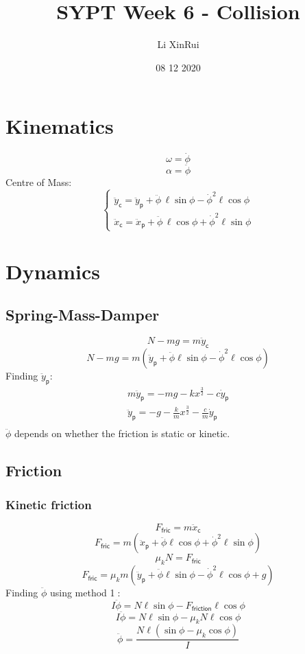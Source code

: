 \documentclass{scrartcl}
\begin{document}
\title{SYPT Week 6 - Collision}
\author{Li XinRui}
\date{08 12 2020}
\setlength\parindent{0pt}

\maketitle
\section{Kinematics}
$$\omega=\dot\phi$$
$$\alpha=\ddot\phi$$
Centre of Mass:
$$
    \begin{cases}
      \ddot{y}_{\textsf{c}}=\ddot{y}_{\textsf{p}}+\ddot \phi \, \ell \sin\phi-\dot \phi^2 \ell \cos\phi\\
      \ddot{x}_{\textsf{c}}=\ddot{x}_{\textsf{p}}+\ddot \phi \, \ell \cos \phi+ \dot \phi^2 \ell \sin\phi
    \end{cases}    
$$


\section{Dynamics}
\subsection{Spring-Mass-Damper}
$$N-mg=m\ddot{y}_{\textsf{c}}$$
$$N-mg=m(\boxed{\ddot{y}_{\textsf{p}}}+\boxed{\ddot \phi} \ell \sin\phi-\dot \phi^2 \ell \cos\phi)$$
Finding $\ddot{y}_{\textsf{p}}$:
$$
\boxed{
\begin{aligned}
m\ddot{y}_{\textsf{p}}=-mg-kx^\frac{3}{2}-c\dot{y}_{\textsf{p}}\\
\boxed{\ddot{y}_{\textsf{p}}}=-g-\frac{k}{m}x^\frac{3}{2}-\frac{c}{m} \boxed{\dot{y}_{\textsf{p}}}\\
\end{aligned}
}
$$
$\ddot \phi$ depends on whether the friction is static or kinetic.

\subsection{Friction}
\subsubsection{Kinetic friction}
$$F_{\textsf{fric}}=m\ddot{x}_{\textsf{c}}$$
$$F_{\textsf{fric}}=m(\boxed{\ddot{x}_{\textsf{p}}}+\boxed{\ddot \phi} \ell \cos \phi+ \dot \phi^2 \ell \sin\phi)$$
$$\mu_kN=F_{\textsf{fric}}$$
$$\boxed{F_{\textsf{fric}}=
\mu_km(\ddot{y}_{\textsf{p}}+\ddot \phi \ell \sin\phi-\dot \phi^2 \ell \cos\phi+g)}$$
\vspace{\baselineskip}
Finding $\ddot \phi$ using method \textcircled{1}:
$$I\ddot \phi=N\ell\sin\phi-F_{\textsf{friction}}\ell\cos\phi$$
$$I\ddot \phi=N\ell\sin\phi-\mu_kN\ell\cos\phi$$
$$\ddot \phi=\frac{N\ell(\sin\phi-\mu_k\cos\phi)}{I}$$
\end{document}
